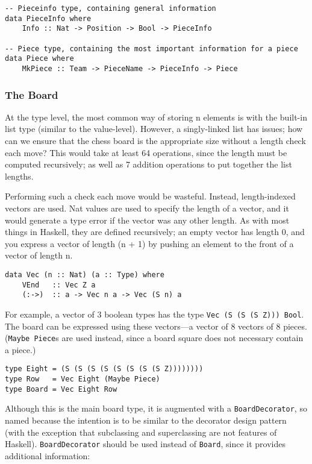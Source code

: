 \documentclass[12pt, a4paper]{scrartcl}
\begin{document}
\begin{lstlisting}
-- Pieceinfo type, containing general information
data PieceInfo where
    Info :: Nat -> Position -> Bool -> PieceInfo

-- Piece type, containing the most important information for a piece
data Piece where
    MkPiece :: Team -> PieceName -> PieceInfo -> Piece
\end{lstlisting}

\subsubsection{The Board}

At the type level, the most common way of storing n elements is with the built-in list type (similar to the value-level). However, a singly-linked list has issues; how can we ensure that the chess board is the appropriate size without a length check each move? This would take at least 64 operations, since the length must be computed recursively; as well as 7 addition operations to put together the list lengths.

Performing such a check each move would be wasteful. Instead, length-indexed vectors are used. Nat values are used to specify the length of a vector, and it would generate a type error if the vector was any other length. As with most things in Haskell, they are defined recursively; an empty vector has length 0, and you express a vector of length (n + 1) by pushing an element to the front of a vector of length n.

\begin{lstlisting}
data Vec (n :: Nat) (a :: Type) where
    VEnd   :: Vec Z a
    (:->)  :: a -> Vec n a -> Vec (S n) a
\end{lstlisting}

For example, a vector of 3 boolean types has the type \lstinline{Vec (S (S (S Z))) Bool}. The board can be expressed using these vectors---a vector of 8 vectors of 8 pieces. (\lstinline{Maybe Piece}s are used instead, since a board square does not necessary contain a piece.)

\begin{lstlisting}
type Eight = (S (S (S (S (S (S (S (S Z))))))))
type Row   = Vec Eight (Maybe Piece)
type Board = Vec Eight Row
\end{lstlisting}

Although this is the main board type, it is augmented with a \lstinline{BoardDecorator}, so named because the intention is to be similar to the decorator design pattern\cite{decorator} (with the exception that subclassing and superclassing are not features of Haskell). \lstinline{BoardDecorator} should be used instead of \lstinline{Board}, since it provides additional information:
\end{document}
